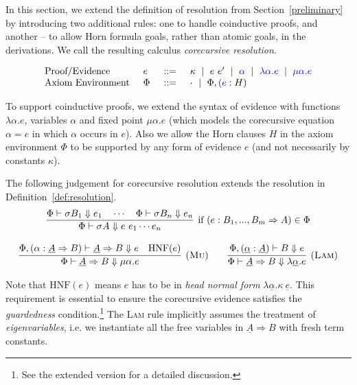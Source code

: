 \documentclass{llncs}
\begin{document}
In this section, we extend the definition of resolution from  Section~\ref{preliminary}
by introducing two additional rules: one to handle coinductive proofs, and another -- to allow Horn formula goals, rather than atomic goals, in the derivations.
We call the resulting calculus \textit{corecursive resolution}.


\begin{definition}
\label{syntax}
{\small
\[
\begin{array}{l@{\hspace{5mm}}l@{\hspace{5mm}}c@{\hspace{5mm}}l}
    \text{Proof/Evidence} &  e    & ::= & \kappa ~\mid~ e \ e' ~\mid~ \textcolor{blue}{\alpha} ~\mid~ \textcolor{blue}{\lambda \alpha . e} ~\mid~ \textcolor{blue}{\mu \alpha. e} \\
    \text{Axiom Environment}  &  \Phi & ::= & \cdot ~\mid~ \Phi, (\textcolor{blue}{e} : H)
\end{array}
\]}
\end{definition}

To support coinductive proofs, we extend the syntax of evidence with functions
$\lambda \alpha . e$, variables $\alpha$ and fixed point $\mu \alpha . e$ (which models the corecursive equation $\alpha = e$ in which $\alpha$ occurs in $e$). Also
we allow the Horn clauses $H$ in the axiom environment $\Phi$ to be supported by any
form of evidence $e$ (and not necessarily by constants $\kappa$).



\begin{definition}\label{def:cresolution}
  The following judgement for corecursive resolution extends the resolution in Definition~\ref{def:resolution}. {\small
\[\begin{array}{c}
  \infer[\text{if}~(e : B_1,..., B_m \Rightarrow A) \in \Phi]
    {\Phi \vdash \sigma A \Downarrow e~e_1 \cdots e_n}
    { \Phi \vdash \sigma B_1 \Downarrow e_1 \quad \cdots \quad \Phi \vdash \sigma B_n \Downarrow e_n 
      } 
\\ \\
    \infer[(\textsc{Mu})]
    {\Phi \vdash \underline{A} \Rightarrow B \Downarrow \mu \alpha . e }
    {\Phi, (\alpha : \underline{A} \Rightarrow B) \vdash \underline{A} \Rightarrow B \Downarrow e & \mathrm{HNF}(e)} 
\quad\quad
    \infer[(\textsc{Lam})]
    {\Phi \vdash \underline{A} \Rightarrow B \Downarrow \lambda \underline{\alpha} . e}
    {\Phi, (\underline{\alpha} : \underline{A}) \vdash  B \Downarrow e}
  \end{array}
\]}

\end{definition}
Note that $\mathrm{HNF}(e)$ means $e$ has to be in \textit{head normal form}
$\lambda \underline{\alpha}.\kappa\ \underline{e}$. This requirement is essential to ensure
the corecursive evidence satisfies the \textit{guardedness} condition.\footnote{See the extended version for a detailed discussion.}  The \textsc{Lam} rule implicitly assumes the treatment of \textit{eigenvariables},
i.e. we instantiate all the free variables in $\underline{A} \Rightarrow B$
with fresh term constants. 
\end{document}
